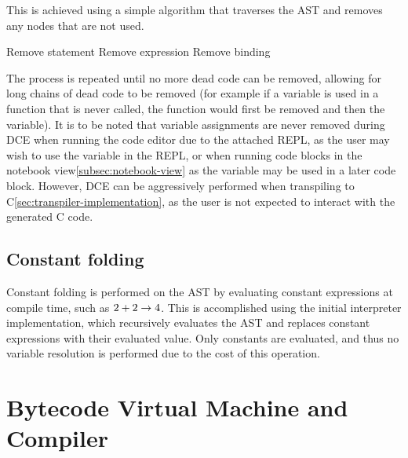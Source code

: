 This is achieved using a simple algorithm that traverses the AST and removes any nodes that are not used.

\begin{algorithmic}
                    \State Remove statement
                \EndIf
                    \State Remove expression
                \EndIf
                    \State Remove binding
                \EndIf
            \EndIf
        \EndFor
    \EndWhile
\end{algorithmic}

The process is repeated until no more dead code can be removed, allowing for long chains of dead code to be 
removed (for example if a variable is used in a function that is never called, the function would first be removed
and then the variable).
It is to be noted that variable assignments are never removed during DCE when running the code editor due to the 
attached REPL, as the user may wish to use the variable in the REPL\@, or when running code blocks in the notebook 
view\ref{subsec:notebook-view} as the variable may be used in a later code block.
However, DCE can be aggressively performed when transpiling to C\ref{sec:transpiler-implementation}, as the user is not expected to 
interact with the generated C code.

\subsection{Constant folding}\label{subsec:constant-folding}

Constant folding is performed on the AST by evaluating constant expressions at compile time, such as $2 + 2 \rightarrow 4$.
This is accomplished using the initial interpreter implementation, which recursively evaluates the AST and replaces
constant expressions with their evaluated value.
Only constants are evaluated, and thus no variable resolution is performed due to the cost of this operation.

\section{Bytecode Virtual Machine and Compiler}\label{sec:initial-design-of-the-bytecode-virtual-machine-and-compiler}

